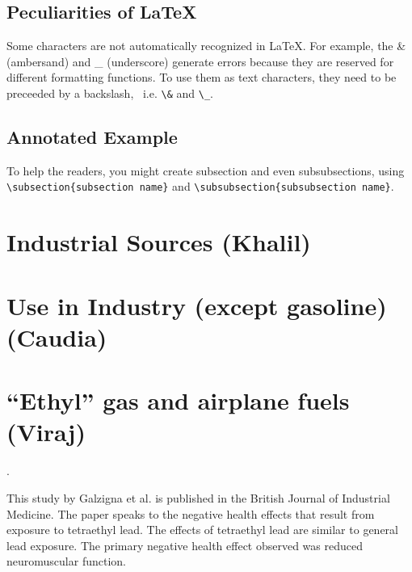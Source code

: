 \documentclass{article}\usepackage[]{graphicx}\usepackage[]{color}
\begin{document}
\subsection{Peculiarities of \LaTeX}

Some characters are not automatically recognized in \LaTeX. For example, the \& (ambersand) and \_ (underscore) generate errors because they are reserved for different formatting functions. To use them as text characters, they need to be preceeded by a backslash, \, i.e. \verb!\&! and \verb!\_!. 

\subsection{Annotated Example}

\bigskip

\bigskip


To help the readers, you might create subsection and even subsubsections, using \verb!\subsection{subsection name}! and \verb!\subsubsection{subsubsection name}!. 


\section{Industrial Sources (Khalil)}


\section{Use in Industry (except gasoline) (Caudia)}

\section{``Ethyl'' gas and airplane fuels (Viraj)}


\bigskip
\noindent {} .

This study by Galzigna et al. is published in the British Journal of Industrial Medicine. The paper speaks to the negative health effects that result from exposure to tetraethyl lead. The effects of tetraethyl lead are similar to general lead exposure. The primary negative health effect observed was reduced neuromuscular function.
\end{document}

